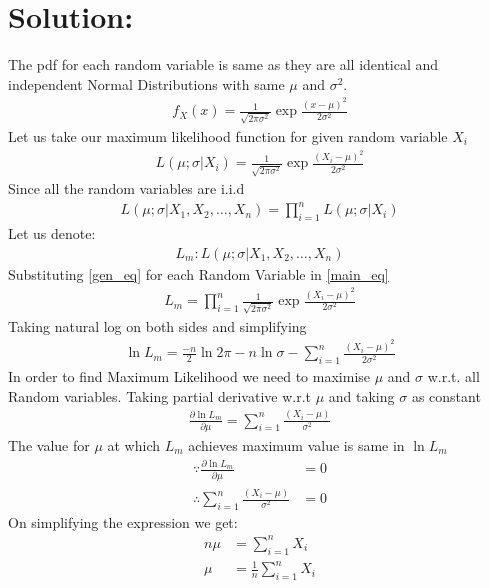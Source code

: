 \documentclass[journal,12pt,twocolumn]{IEEEtran}
\begin{document}
\section*{Solution:}
The pdf for each random variable is same as they are all identical and independent Normal Distributions with same $\mu$ and $\sigma^2$.
\begin{align}
    f_X(x) = \frac{1}{\sqrt{2\pi\sigma^2}}\exp{\frac{(x-\mu)^2}{2\sigma^2}}
\end{align}
Let us take our maximum likelihood function for given random variable $X_i$
\begin{align}
    L(\mu ; \sigma | X_i) = \frac{1}{\sqrt{2\pi\sigma^2}}\exp{\frac{(X_i-\mu)^2}{2\sigma^2}}\label{gen_eq}
\end{align}
Since all the random variables are i.i.d
\begin{align}
    L(\mu ; \sigma | X_1,X_2,\ldots,X_n) = \prod_{i=1}^nL(\mu ; \sigma | X_i)\label{main_eq}
\end{align}
Let us denote:
\begin{align}
    L_m : L(\mu ; \sigma | X_1,X_2,\ldots,X_n)
\end{align}
Substituting \eqref{gen_eq} for each Random Variable in \eqref{main_eq}
\begin{align}
    L_m = \prod_{i=1}^n\frac{1}{\sqrt{2\pi\sigma^2}}\exp{\frac{(X_i-\mu)^2}{2\sigma^2}}
\end{align}
Taking natural log on both sides and simplifying
\begin{align}
    \ln{L_m} = \frac{-n}{2}\ln{2\pi} -n\ln{\sigma} - \sum_{i = 1}^n\frac{(X_i - \mu)^2}{2\sigma^2}
\end{align}
In order to find Maximum Likelihood we need to maximise $\mu$ and $\sigma$ w.r.t. all Random variables. Taking partial derivative w.r.t $\mu$ and taking $\sigma$ as constant 
\begin{align}
    \frac{\partial \ln{L_m}}{\partial \mu} = \sum_{i = 1}^n\frac{(X_i - \mu)}{\sigma^2}
\end{align}
The value for $\mu$ at which $L_m$ achieves maximum value is same in $\ln{L_m}$
\begin{align}
   \because \frac{\partial \ln{L_m}}{\partial \mu} &=0\\
   \therefore \sum_{i = 1}^n\frac{(X_i -\mu)}{\sigma^2}&=0
\end{align}
On simplifying the expression we get:
\begin{align}
    n\mu &= \sum_{i=1}^nX_i\\
    \mu &= \frac{1}{n}\sum_{i=1}^nX_i\label{mu_value}
\end{align}
\end{document}
